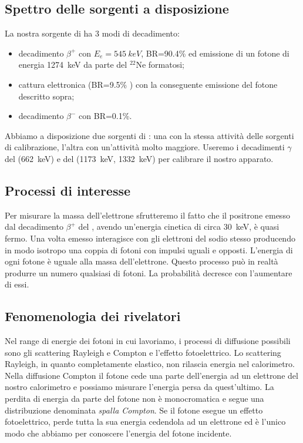 \subsection{Spettro delle sorgenti a disposizione}

La nostra sorgente di \na{} ha 3 modi di decadimento:
\begin{itemize}
\item decadimento $\beta^+$ con $E_e=\SI{545}{keV}$, BR=90.4\% ed emissione di un fotone di energia \SI{1274}{keV} da parte del $^{22}$Ne formatosi;
\item cattura elettronica (BR=9.5\% ) con la conseguente emissione del fotone descritto sopra;
\item decadimento $\beta^-$ con BR=0.1\%.
\end{itemize}

Abbiamo a disposizione due sorgenti di \na{}: una con la stessa attività delle sorgenti di calibrazione, l'altra con un'attività molto maggiore.
Useremo i decadimenti $\gamma$ del \cs{} (\SI{662}{keV}) e del \co{} (\SI{1173}{keV}, \SI{1332}{keV}) per calibrare il nostro apparato.

\subsection{Processi di interesse}

Per misurare la massa dell'elettrone sfrutteremo il fatto che il positrone emesso dal decadimento $\beta^+$ del \na{}, avendo un'energia cinetica di circa \SI{30}{keV}, è quasi fermo. 
Una volta emesso interagisce con gli elettroni del sodio stesso producendo in modo isotropo una coppia di fotoni con impulsi uguali e opposti. L'energia di ogni fotone è uguale alla massa dell'elettrone. Questo processo può in realtà produrre un numero qualsiasi di fotoni. La probabilità decresce con l'aumentare di essi.


\subsection{Fenomenologia dei rivelatori}

Nel range di energie dei fotoni in cui lavoriamo, i processi di diffusione possibili sono gli scattering Rayleigh e Compton e l'effetto fotoelettrico.
Lo scattering Rayleigh, in quanto completamente elastico, non rilascia energia nel calorimetro.
Nella diffusione Compton il fotone cede una parte dell'energia ad un elettrone del nostro calorimetro e possiamo misurare l'energia persa da quest'ultimo. La perdita di energia da parte del fotone non è monocromatica e segue una distribuzione denominata \emph{spalla Compton}.
Se il fotone esegue un effetto fotoelettrico, perde tutta la sua energia cedendola ad un elettrone ed è l'unico modo che abbiamo per conoscere l'energia del fotone incidente.

